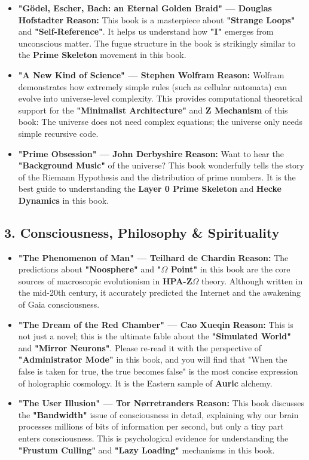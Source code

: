 \begin{itemize}
\item \textbf{"Gödel, Escher, Bach: an Eternal Golden Braid" — Douglas Hofstadter}
\textbf{Reason:} This book is a masterpiece about \textbf{"Strange Loops"} and \textbf{"Self-Reference"}. It helps us understand how \textbf{"I"} emerges from unconscious matter. The fugue structure in the book is strikingly similar to the \textbf{Prime Skeleton} movement in this book.

\item \textbf{"A New Kind of Science" — Stephen Wolfram}
\textbf{Reason:} Wolfram demonstrates how extremely simple rules (such as cellular automata) can evolve into universe-level complexity. This provides computational theoretical support for the \textbf{"Minimalist Architecture"} and \textbf{Z Mechanism} of this book: The universe does not need complex equations; the universe only needs simple recursive code.

\item \textbf{"Prime Obsession" — John Derbyshire}
\textbf{Reason:} Want to hear the \textbf{"Background Music"} of the universe? This book wonderfully tells the story of the Riemann Hypothesis and the distribution of prime numbers. It is the best guide to understanding the \textbf{Layer 0 Prime Skeleton} and \textbf{Hecke Dynamics} in this book.
\end{itemize}

\subsection*{3. Consciousness, Philosophy \& Spirituality}

\begin{itemize}
\item \textbf{"The Phenomenon of Man" — Teilhard de Chardin}
\textbf{Reason:} The predictions about \textbf{"Noosphere"} and \textbf{"$\Omega$ Point"} in this book are the core sources of macroscopic evolutionism in \textbf{HPA-Z$\Omega$} theory. Although written in the mid-20th century, it accurately predicted the Internet and the awakening of Gaia consciousness.

\item \textbf{"The Dream of the Red Chamber" — Cao Xueqin}
\textbf{Reason:} This is not just a novel; this is the ultimate fable about the \textbf{"Simulated World"} and \textbf{"Mirror Neurons"}. Please re-read it with the perspective of \textbf{"Administrator Mode"} in this book, and you will find that "When the false is taken for true, the true becomes false" is the most concise expression of holographic cosmology. It is the Eastern sample of \textbf{Auric} alchemy.

\item \textbf{"The User Illusion" — Tor Nørretranders}
\textbf{Reason:} This book discusses the \textbf{"Bandwidth"} issue of consciousness in detail, explaining why our brain processes millions of bits of information per second, but only a tiny part enters consciousness. This is psychological evidence for understanding the \textbf{"Frustum Culling"} and \textbf{"Lazy Loading"} mechanisms in this book.
\end{itemize}

